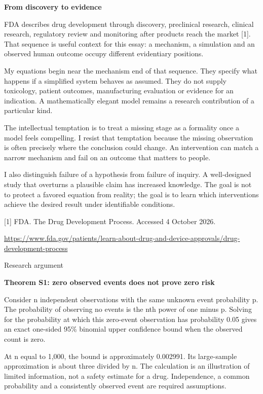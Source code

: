 \documentclass[10pt]{article}
\begin{document}
{\LARGE\bfseries\color{ink}From discovery to evidence}\par\vspace{7pt}
FDA describes drug development through discovery, preclinical research, clinical research, regulatory review and monitoring after products reach the market [1]. That sequence is useful context for this essay: a mechanism, a simulation and an observed human outcome occupy different evidentiary positions.\par
My equations begin near the mechanism end of that sequence. They specify what happens if a simplified system behaves as assumed. They do not supply toxicology, patient outcomes, manufacturing evaluation or evidence for an indication. A mathematically elegant model remains a research contribution of a particular kind.\par
The intellectual temptation is to treat a missing stage as a formality once a model feels compelling. I resist that temptation because the missing observation is often precisely where the conclusion could change. An intervention can match a narrow mechanism and fail on an outcome that matters to people.\par
I also distinguish failure of a hypothesis from failure of inquiry. A well-designed study that overturns a plausible claim has increased knowledge. The goal is not to protect a favored equation from reality; the goal is to learn which interventions achieve the desired result under identifiable conditions.\par
{\small [1] FDA. The Drug Development Process. Accessed 4 October 2026.\par\url{https://www.fda.gov/patients/learn-about-drug-and-device-approvals/drug-development-process}\par}
\clearpage
{\small\color{accent}Research argument}\par
{\LARGE\bfseries\color{ink}Theorem S1: zero observed events does not prove zero risk}\par\vspace{7pt}
Consider n independent observations with the same unknown event probability p. The probability of observing no events is the nth power of one minus p. Solving for the probability at which this zero-event observation has probability 0.05 gives an exact one-sided 95\% binomial upper confidence bound when the observed count is zero.\par
At n equal to 1,000, the bound is approximately 0.002991. Its large-sample approximation is about three divided by n. The calculation is an illustration of limited information, not a safety estimate for a drug. Independence, a common probability and a consistently observed event are required assumptions.\par
\end{document}
